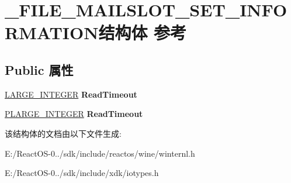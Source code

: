 \hypertarget{struct___f_i_l_e___m_a_i_l_s_l_o_t___s_e_t___i_n_f_o_r_m_a_t_i_o_n}{}\section{\+\_\+\+F\+I\+L\+E\+\_\+\+M\+A\+I\+L\+S\+L\+O\+T\+\_\+\+S\+E\+T\+\_\+\+I\+N\+F\+O\+R\+M\+A\+T\+I\+O\+N结构体 参考}
\label{struct___f_i_l_e___m_a_i_l_s_l_o_t___s_e_t___i_n_f_o_r_m_a_t_i_o_n}
\subsection*{Public 属性}
\begin{DoxyCompactItemize}
\item 
\mbox{\label{struct___f_i_l_e___m_a_i_l_s_l_o_t___s_e_t___i_n_f_o_r_m_a_t_i_o_n_a2e426258f4c3b457d49f5b224bb7c7ad}} 
\hyperlink{union___l_a_r_g_e___i_n_t_e_g_e_r}{L\+A\+R\+G\+E\+\_\+\+I\+N\+T\+E\+G\+ER} {\bfseries Read\+Timeout}
\item 
\mbox{\label{struct___f_i_l_e___m_a_i_l_s_l_o_t___s_e_t___i_n_f_o_r_m_a_t_i_o_n_ae6198ab8e6c1b8fcc4c39a97885ce4b5}} 
\hyperlink{union___l_a_r_g_e___i_n_t_e_g_e_r}{P\+L\+A\+R\+G\+E\+\_\+\+I\+N\+T\+E\+G\+ER} {\bfseries Read\+Timeout}
\end{DoxyCompactItemize}


该结构体的文档由以下文件生成\+:\begin{DoxyCompactItemize}
\item 
E\+:/\+React\+O\+S-\/0../sdk/include/reactos/wine/winternl.\+h\item 
E\+:/\+React\+O\+S-\/0../sdk/include/xdk/iotypes.\+h\end{DoxyCompactItemize}
